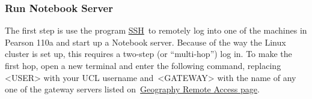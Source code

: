 \documentclass[a4paper]{article}
\begin{document}
\subsubsection{Run Notebook Server}

The first step is use the program \href{http://linuxcommand.org/man_pages/ssh1.html}{SSH}~to remotely log into one of the machines in Pearson 110a and start up a Notebook server.
Because of the way the Linux cluster is set up, this requires a two-step (or ``multi-hop'') log in.
To make the first hop, open a new terminal and enter the following command, replacing \textless{}USER\textgreater{} with your UCL username and~\textless{}GATEWAY\textgreater{} with the name of any one of the gateway servers listed on~\href{http://www.geog.ucl.ac.uk/resources/computer-support/linux-remote-access}{Geography Remote Access page}.
\end{document}
